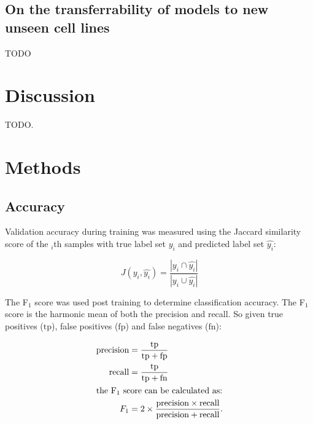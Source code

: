 \documentclass[a4paper,11pt,twoside,openright]{scrbook}
\begin{document}
\subsection{On the transferrability of models to new unseen cell lines}
TODO




\section{Discussion}
TODO.










\section{Methods}


\subsection{Accuracy}
Validation accuracy during training was measured using the Jaccard similarity score of the $_i$th samples with true label set $y_i$ and predicted label set $\hat{y_i}$:

\begin{equation}
    J(y_i, \hat{y_i}) = \frac{|y_i \cap \hat{y_i}|}{|y_i \cup \hat{y_i}|}
\end{equation}

The F$_1$ score was used post training to determine classification accuracy.
The F$_1$ score is the harmonic mean of both the precision and recall.
So given true positives ($\text{tp}$), false positives ($\text{fp}$) and false negatives ($\text{fn}$):

\begin{align}
        \text{precision} &= \frac{ \text{tp} }{ \text{tp} + \text{fp} } \\
        \text{recall} &= \frac{\text{tp}}{\text{tp} + \text{fn}} \\
        \intertext{the F$_1$ score can be calculated as:}
        F_1 &= 2 \times \frac{\text{precision} \times \text{recall}}{\text{precision} + \text{recall}}.
\end{align}
\end{document}
